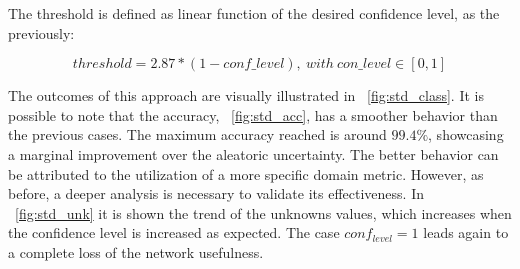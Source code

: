 The threshold is defined as linear function of the desired confidence level, as the previously:

\[
	threshold = 2.87 * (1 - conf \_ level), \ with \ con \_ level \in [0,1]
\]

The outcomes of this approach are visually illustrated in \Fig~\ref{fig:std_class}. It is possible to note that the accuracy, \Fig~\ref{fig:std_acc}, has a smoother behavior than the previous cases. The maximum accuracy reached is around $99.4\%$, showcasing a marginal improvement over the aleatoric uncertainty. The better behavior can be attributed to the utilization of a more specific domain metric. However, as before, a deeper analysis is necessary to validate its effectiveness.
In \Fig~\ref{fig:std_unk} it is shown the trend of the unknowns values, which increases when the confidence level is increased as expected.
The case $conf_{level}=1$ leads again to a complete loss of the network usefulness.

